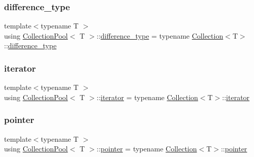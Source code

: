\mbox{\label{class_collection_pool_a5e8db21ac58139c891fee4ae87295744}} 
\subsubsection{\texorpdfstring{difference\+\_\+type}{difference\_type}}
{\footnotesize\ttfamily template$<$typename T $>$ \\
using \hyperlink{class_collection_pool}{Collection\+Pool}$<$ T $>$\+::\hyperlink{class_collection_a60b36ef7aba0a88dff0e98fc2adb98a8}{difference\+\_\+type} =  typename \hyperlink{class_collection}{Collection}$<$T$>$\+::\hyperlink{class_collection_a60b36ef7aba0a88dff0e98fc2adb98a8}{difference\+\_\+type}}

\mbox{\label{class_collection_pool_a7beafeb93ccc043bcde933faab05718f}} 
\subsubsection{\texorpdfstring{iterator}{iterator}}
{\footnotesize\ttfamily template$<$typename T $>$ \\
using \hyperlink{class_collection_pool}{Collection\+Pool}$<$ T $>$\+::\hyperlink{class_collection_a317dca4fdf1eb2e47643bb60c620f802}{iterator} =  typename \hyperlink{class_collection}{Collection}$<$T$>$\+::\hyperlink{class_collection_a317dca4fdf1eb2e47643bb60c620f802}{iterator}}

\mbox{\label{class_collection_pool_a3bfec6c487a93170866fde4b57a85b21}} 
\subsubsection{\texorpdfstring{pointer}{pointer}}
{\footnotesize\ttfamily template$<$typename T $>$ \\
using \hyperlink{class_collection_pool}{Collection\+Pool}$<$ T $>$\+::\hyperlink{class_collection_a9a5b5d9b389c113364d527900c745efb}{pointer} =  typename \hyperlink{class_collection}{Collection}$<$T$>$\+::\hyperlink{class_collection_a9a5b5d9b389c113364d527900c745efb}{pointer}}

